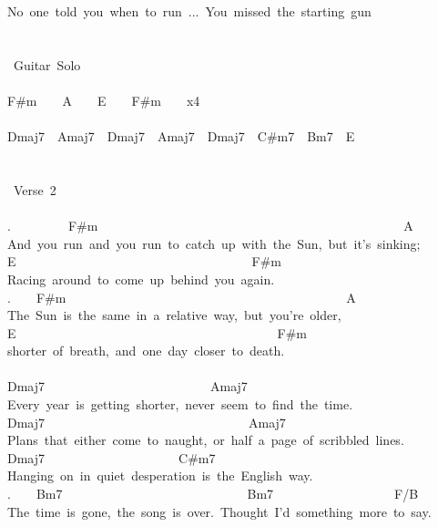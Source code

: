 {No\ one\ told\ you\ when\ to\ run\ ...\ You\ missed\ the\ starting\ gun\\
\\
\\
\lbrack\ Guitar\ Solo\rbrack\\
\\
F\#m\ \ \ \ A\ \ \ \ E\ \ \ \ F\#m\ \ \ \ x4\\
\\
Dmaj7\ \ Amaj7\ \ Dmaj7\ \ Amaj7\ \ Dmaj7\ \ C\#m7\ \ Bm7\ \ E\\
\\
\\
\lbrack\ Verse\ 2\rbrack\\
\\
.\ \ \ \ \ \ \ \ \ F\#m\ \ \ \ \ \ \ \ \ \ \ \ \ \ \ \ \ \ \ \ \ \ \ \ \ \ \ \ \ \ \ \ \ \ \ \ \ \ \ \ \ \ \ \ \ \ \ \ A\\
And\ you\ run\ and\ you\ run\ to\ catch\ up\ with\ the\ Sun,\ but\ it's\ sinking;\\
E\ \ \ \ \ \ \ \ \ \ \ \ \ \ \ \ \ \ \ \ \ \ \ \ \ \ \ \ \ \ \ \ \ \ \ \ \ F\#m\\
Racing\ around\ to\ come\ up\ behind\ you\ again.\\
.\ \ \ \ F\#m\ \ \ \ \ \ \ \ \ \ \ \ \ \ \ \ \ \ \ \ \ \ \ \ \ \ \ \ \ \ \ \ \ \ \ \ \ \ \ \ \ \ \ \ A\\
The\ Sun\ is\ the\ same\ in\ a\ relative\ way,\ but\ you're\ older,\\
E\ \ \ \ \ \ \ \ \ \ \ \ \ \ \ \ \ \ \ \ \ \ \ \ \ \ \ \ \ \ \ \ \ \ \ \ \ \ \ \ \ F\#m\\
shorter\ of\ breath,\ and\ one\ day\ closer\ to\ death.\\
\\
Dmaj7\ \ \ \ \ \ \ \ \ \ \ \ \ \ \ \ \ \ \ \ \ \ \ \ \ \ Amaj7\\
Every\ year\ is\ getting\ shorter,\ never\ seem\ to\ find\ the\ time.\\
Dmaj7\ \ \ \ \ \ \ \ \ \ \ \ \ \ \ \ \ \ \ \ \ \ \ \ \ \ \ \ \ \ \ \ Amaj7\\
Plans\ that\ either\ come\ to\ naught,\ or\ half\ a\ page\ of\ scribbled\ lines.\\
Dmaj7\ \ \ \ \ \ \ \ \ \ \ \ \ \ \ \ \ \ \ \ \ C\#m7\\
Hanging\ on\ in\ quiet\ desperation\ is\ the\ English\ way.\\
.\ \ \ \ Bm7\ \ \ \ \ \ \ \ \ \ \ \ \ \ \ \ \ \ \ \ \ \ \ \ \ \ \ \ \ Bm7\ \ \ \ \ \ \ \ \ \ \ \ \ \ \ \ \ \ \ F/B\\
The\ time\ is\ gone,\ the\ song\ is\ over.\ Thought\ I'd\ something\ more\ to\ say.}
